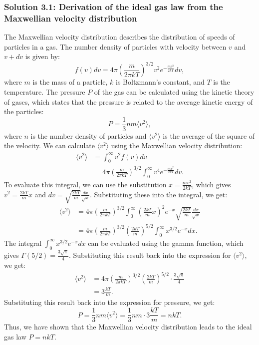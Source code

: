 \subsubsection*{Solution 3.1: Derivation of the ideal gas law from the Maxwellian velocity distribution}
The Maxwellian velocity distribution describes the distribution of speeds of particles in a gas. The number density
of particles with velocity between $v$ and $v + dv$ is given by:
\begin{equation}
f(v) dv = 4\pi \left( \frac{m}{2\pi kT} \right)^{3/2} v^2 e^{-\frac{mv^2}{2kT}} dv,
\end{equation}
where $m$ is the mass of a particle, $k$ is Boltzmann's constant, and $T$ is the temperature. The pressure $P$ of the gas can be calculated using the kinetic theory of gases, which states that the pressure is related to the average kinetic energy of the particles:
\begin{equation}
P = \frac{1}{3} n m \langle v^2 \rangle,
\end{equation}where $n$ is the number density of particles and $\langle v^2 \rangle$ is the average of the square of the velocity. We can calculate $\langle v^2 \rangle$ using the Maxwellian velocity distribution:
\begin{align*}
\langle v^2 \rangle &= \int_0^\infty v^2 f(v) dv \\
&= 4\pi \left( \frac{m}{2\pi kT} \right)^{3/2} \int_0^\infty v^4 e^{-\frac{mv^2}{2kT}} dv.
\end{align*}
To evaluate this integral, we can use the substitution $x = \frac{mv^2}{2kT}$, which gives $v^2 = \frac{2kT}{m} x$ and $dv = \sqrt{\frac{2kT}{m}} \frac{dx}{\sqrt{x}}$. 
Substituting these into the integral, we get:
\begin{align*}
\langle v^2 \rangle &= 4\pi \left( \frac{m}{2\pi kT} \right)^{3/2} \int_0^\infty \left( \frac{2kT}{m} x \right)^2 e^{-x} \sqrt{\frac{2kT}{m}} \frac{dx}{\sqrt{x}} \\
&= 4\pi \left( \frac{m}{2\pi kT} \right)^{3/2} \left( \frac{2kT}{m} \right)^{5/2} \int_0^\infty x^{3/2} e^{-x} dx.
\end{align*}
The integral $\int_0^\infty x^{3/2} e^{-x} dx$ can be evaluated using the gamma function, which gives $\Gamma(5/2) = \frac{3\sqrt{\pi}}{4}$. Substituting this result back into the expression for $\langle v^2 \rangle$, we get:
\begin{align*}
\langle v^2 \rangle &= 4\pi \left( \frac{m}{2\pi kT} \right)^{3/2} \left( \frac{2kT}{m} \right)^{5/2} \cdot \frac{3\sqrt{\pi}}{4} \\
&= 3 \frac{kT}{m}.
\end{align*}
Substituting this result back into the expression for pressure, we get:
\begin{equation}
P = \frac{1}{3} n m \langle v^2 \rangle = \frac{1}{3} n m \cdot 3 \frac{kT}{m} = nkT.
\end{equation}
Thus, we have shown that the Maxwellian velocity distribution leads to the ideal gas law $P = nkT$.